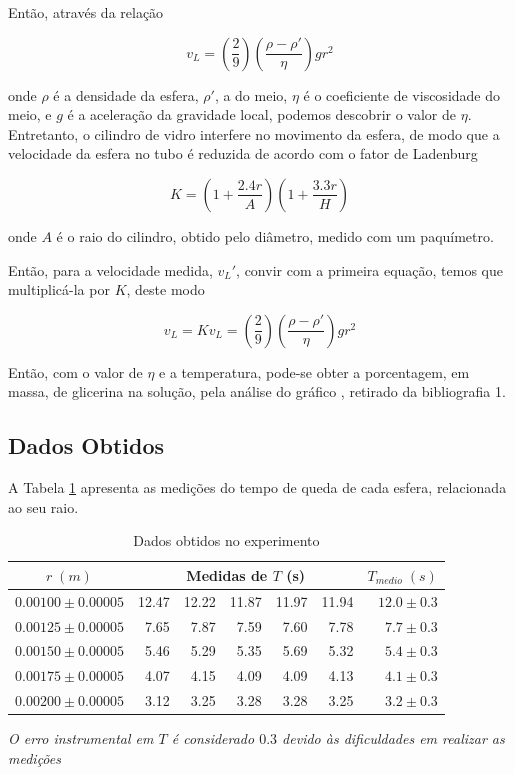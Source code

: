 \documentclass[12pt,a4paper]{article}
\begin{document}
Então, através da relação

$$v_L = (\frac{2}{9}) (\frac{\rho - \rho'}{\eta}) g r^2$$

onde $\rho$ é a densidade da esfera, $\rho'$, a do meio, $\eta$ é o coeficiente de viscosidade do meio, e $g$ é a aceleração da gravidade local, podemos descobrir o valor de $\eta$.\\

Entretanto, o cilindro de vidro interfere no movimento da esfera, de modo que a velocidade da esfera no tubo é reduzida de acordo com o fator de Ladenburg

$$K = (1 + \frac{2.4r}{A})(1 + \frac{3.3r}{H})$$

onde $A$ é o raio do cilindro, obtido pelo diâmetro, medido com um paquímetro.

Então, para a velocidade medida, $v_L'$, convir com a primeira equação, temos que multiplicá-la por $K$, deste modo

$$v_L = Kv_L = (\frac{2}{9}) (\frac{\rho - \rho'}{\eta}) g r^2$$

Então, com o valor de $\eta$ e a temperatura, pode-se obter a porcentagem, em massa, de glicerina na solução, pela análise do gráfico %
, retirado da bibliografia 1.\\

\subsection{Dados Obtidos}

A Tabela \ref{dados} apresenta as medições do tempo de queda de cada esfera, relacionada ao seu raio.

\begin{table}[!htbp]

\centering
\def\arraystretch{1.5}
\caption{Dados obtidos no experimento}

\begin{tabular}{|c|rrrrr|r|}
\hline
$ r \; (m)$ & \multicolumn{5}{c|}{Medidas de $T$ \;  (s)} & $T_{medio} \; (s)$  \\
\hline
  $ 0.00100 \pm 0.00005 $ &12.47 & 12.22 & 11.87 & 11.97 & 11.94 & $ 12.0 \pm 0.3 $ \\
  \hline
  $ 0.00125 \pm 0.00005 $ &7.65 & 7.87 & 7.59 & 7.60 & 7.78  & $ 7.7 \pm 0.3 $   \\
  \hline
  $ 0.00150 \pm 0.00005 $ &5.46 & 5.29 & 5.35 & 5.69 & 5.32 & $ 5.4 \pm 0.3 $     \\
  \hline
  $ 0.00175 \pm 0.00005 $ &4.07 & 4.15 & 4.09 & 4.09 & 4.13  & $ 4.1 \pm 0.3 $    \\
  \hline
  $ 0.00200 \pm 0.00005 $ &3.12 & 3.25 & 3.28 & 3.28 & 3.25 & $ 3.2 \pm 0.3 $       \\
\hline
\end{tabular}

\emph{O erro instrumental em $T$ é considerado $0.3$ devido às dificuldades em realizar as medições}
\label{dados}
\end{table}
\end{document}
